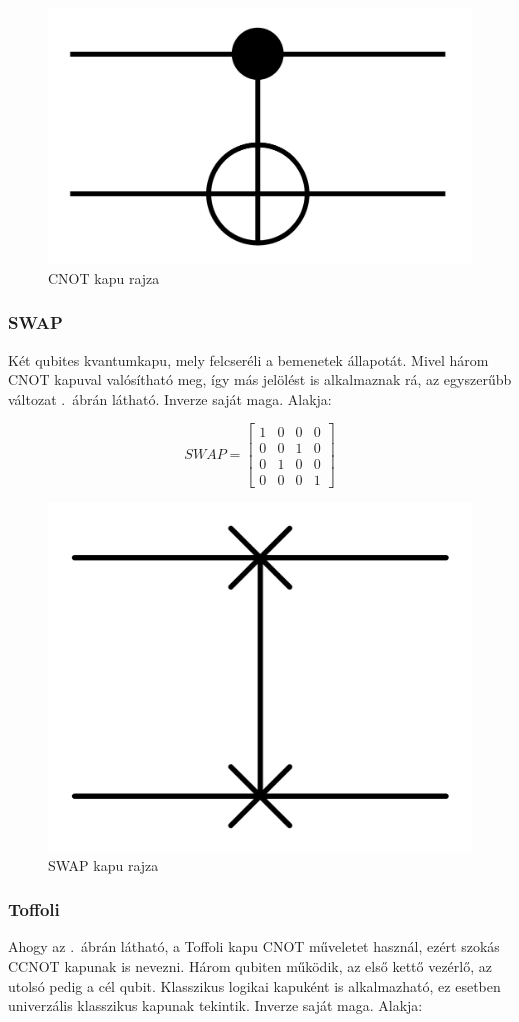 \documentclass[
]{thesis-ekf}
\theoremstyle{definition}
\theoremstyle{remark}
\begin{document}
\begin{figure}[H]
	\centering
	\includegraphics[width=0.25\linewidth]{CNOT}
	\caption{CNOT kapu rajza}
	\label{fig:cnot}
\end{figure}


\subsubsection{SWAP}
Két qubites kvantumkapu, mely felcseréli a bemenetek állapotát. Mivel három CNOT kapuval valósítható meg, így más jelölést is alkalmaznak rá, az egyszerűbb változat \az{\ref{fig:swap}}.~ábrán látható. Inverze saját maga. Alakja:

\begin{equation}
	SWAP= 
	\begin{bmatrix}
		1 & 0 & 0 & 0\\
		0 & 0 & 1 & 0\\
		0 & 1 & 0 & 0\\
		0 & 0 & 0 & 1
	\end{bmatrix}
\end{equation}

\begin{figure}[H]
	\centering
	\includegraphics[width=0.25\linewidth]{SWAP}
	\caption{SWAP kapu rajza}
	\label{fig:swap}
\end{figure}


\subsubsection{Toffoli}
Ahogy az \az{\ref{fig:toffoligate}}.~ábrán látható, a Toffoli kapu CNOT műveletet használ, ezért szokás CCNOT kapunak is nevezni. Három qubiten működik, az első kettő vezérlő, az utolsó pedig a cél qubit. Klasszikus logikai kapuként is alkalmazható, ez esetben univerzális klasszikus kapunak tekintik. Inverze saját maga. Alakja:
\end{document}
